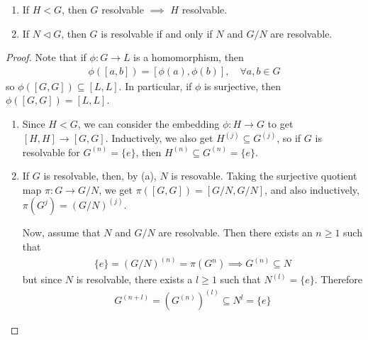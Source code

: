 \begin{prop}[]\label{prop:3-13}
\begin{enumerate}
  \item If $H < G$, then $G$ resolvable $\implies$ $H$ resolvable.
  \item If $N \lhd G$, then $G$ is resolvable if and only if $N$ and $G/N$ are resolvable.
\end{enumerate}
\end{prop}
\begin{proof}
Note that if $\phi: G \to  L$ is a homomorphism, then
\begin{align*}
  \phi([a,b]) = [\phi(a),\phi(b)], \quad \forall a,b \in G
\end{align*}
so $\phi([G,G]) \subseteq [L,L]$.
In particular, if $\phi$ is surjective, then $\phi([G,G]) = [L,L]$.

\begin{enumerate}
  \item Since $H < G$, we can consider the embedding $\phi: H \to G$ to get $[H,H] \to [G,G]$. Inductively, we also get $H^{(j)} \subseteq G^{(j)}$, so if $G$ is resolvable for $G^{(n)} = \{e\}$, then $H^{(n)} \subseteq G^{(n)} = \{e\}$.
  \item If $G$ is resolvable, then, by (a), $N$ is resovable.
    Taking the surjective quotient map $\pi: G \to G/N$, we get $\pi([G,G]) = [G/N,G/N]$, and also inductively, 
    $\pi(G^{j}) = (G/N)^{(j)}$.

    Now, assume that $N$ and $G/N$ are resolvable. Then there exists an $n \geq 1$ such that 
    \begin{align*}
      \{e\} = (G/N)^{(n)} = \pi(G^{n}) \implies G^{(n)} \subseteq N
    \end{align*}
    but since $N$ is resolvable, there exists a $l \geq 1$ such that $N^{(l)} = \{e\}$. Therefore
    \begin{align*}
      G^{(n+l)} = (G^{(n)})^{(l)} \subseteq N^{l} = \{e\}
    \end{align*}
\end{enumerate}
\end{proof}


